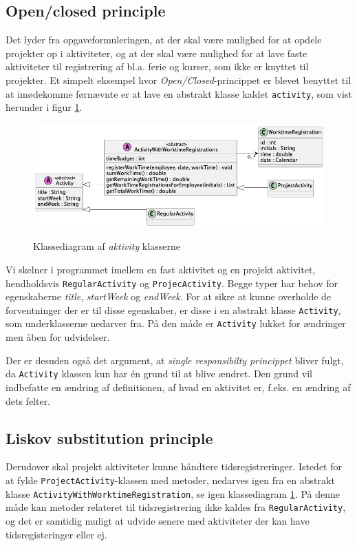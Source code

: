 \subsection{Open/closed principle} \label{sec:solid_o}
Det lyder fra opgaveformuleringen, at der skal være mulighed for at opdele projekter op i aktiviteter, og at der skal være mulighed for at lave faste aktiviteter til registrering af bl.a. ferie og kurser, som ikke er knyttet til projekter. Et simpelt eksempel hvor \textit{Open/Closed}-princippet er blevet benyttet til at imødekomme førnævnte er at lave en abstrakt klasse kaldet \texttt{activity}, som vist herunder i figur \ref{fig:class_activity_example}.

\begin{figure}[H]
    \centering
    \caption{Klassediagram af \textit{aktivity} klasserne}
    \includegraphics[width = 12cm, keepaspectratio]{TaskFusion/out/assets/diagrams/class_liskov_model_example/liskov_model_example.png}
    \label{fig:class_activity_example}
\end{figure}
Vi skelner i programmet imellem en fast aktivitet og en projekt aktivitet, hendholdsvis \texttt{RegularActivity} og \texttt{ProjecActivity}. Begge typer har behov for egenskaberne \textit{title}, \textit{startWeek} og \textit{endWeek}. For at sikre at kunne overholde de forventninger der er til disse egenskaber, er disse i en abstrakt klasse \texttt{Activity}, som underklasserne nedarver fra. På den måde er \texttt{Activity} lukket for ændringer men åben for udvidelser. 

Der er desuden også det argument, at \textit{single responsibilty princippet} bliver fulgt, da \texttt{Activity} klassen kun har én grund til at blive ændret. Den grund vil indbefatte en ændring af definitionen, af hvad en aktivitet er, f.eks. en ændring af dets felter.

\subsection{Liskov substitution principle} \label{sec:solid_l}
Derudover skal projekt aktiviteter kunne håndtere tidsregistreringer. Istedet for at fylde \texttt{ProjectActivity}-klassen med metoder, nedarves igen fra en abstrakt klasse \texttt{ActivityWithWorktimeRegistration}, se igen klassediagram \ref{fig:class_activity_example}. På denne måde kan metoder relateret til tidsregistrering ikke kaldes fra \texttt{RegularActivity}, og det er samtidig muligt at udvide senere med aktiviteter der kan have tidsregisteringer eller ej.

